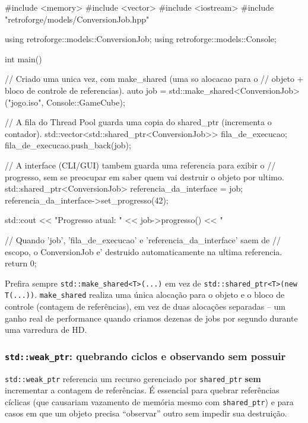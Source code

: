 \begin{CaixaCodigo}
#include <memory>
#include <vector>
#include <iostream>
#include "retroforge/models/ConversionJob.hpp"

using retroforge::models::ConversionJob;
using retroforge::models::Console;

int main() {
    // Criado uma unica vez, com make_shared (uma so alocacao para o
    // objeto + bloco de controle de referencias).
    auto job = std::make_shared<ConversionJob>("jogo.iso", Console::GameCube);

    // A fila do Thread Pool guarda uma copia do shared_ptr (incrementa o contador).
    std::vector<std::shared_ptr<ConversionJob>> fila_de_execucao;
    fila_de_execucao.push_back(job);

    // A interface (CLI/GUI) tambem guarda uma referencia para exibir o
    // progresso, sem se preocupar em saber quem vai destruir o objeto por ultimo.
    std::shared_ptr<ConversionJob> referencia_da_interface = job;
    referencia_da_interface->set_progresso(42);

    std::cout << "Progresso atual: " << job->progresso() << "%

    // Quando 'job', 'fila_de_execucao' e 'referencia_da_interface' saem de
    // escopo, o ConversionJob e' destruido automaticamente na ultima referencia.
    return 0;
}
\end{CaixaCodigo}

\begin{CaixaInfo}
Prefira sempre \texttt{std::make\_shared<T>(...)} em vez de \texttt{std::shared\_ptr<T>(new T(...))}. \texttt{make\_shared} realiza uma única alocação para o objeto e o bloco de controle (contagem de referências), em vez de duas alocações separadas -- um ganho real de performance quando criamos dezenas de jobs por segundo durante uma varredura de HD.
\end{CaixaInfo}

\subsubsection{\texttt{std::weak\_ptr}: quebrando ciclos e observando sem possuir}

\texttt{std::weak\_ptr} referencia um recurso gerenciado por \texttt{shared\_ptr} \textbf{sem} incrementar a contagem de referências. É essencial para quebrar referências cíclicas (que causariam vazamento de memória mesmo com \texttt{shared\_ptr}) e para casos em que um objeto precisa ``observar'' outro sem impedir sua destruição.

